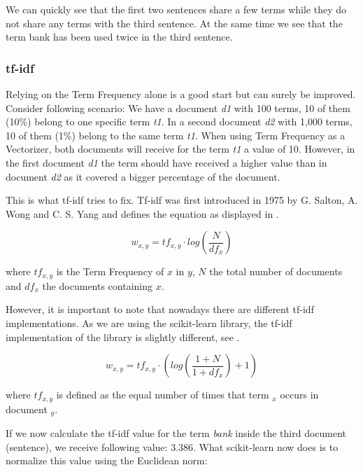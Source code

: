 We can quickly see that the first two sentences share a few terms
while they do not share any terms with the third sentence.
At the same time we see that the term bank has been used twice in the third sentence.

\subsubsection{tf-idf}
\label{subsubsec:3_tf_idf}

Relying on the Term Frequency alone is a good start but can surely be improved.
Consider following scenario:
We have a document \textit{d1} with 100 terms, 10 of them (10\%) belong to one specific term \textit{t1}.
In a second document \textit{d2} with 1,000 terms, 10 of them (1\%) belong to the same term \textit{t1}.
When using Term Frequency as a Vectorizer, both documents will receive for the term \textit{t1} a value of 10.
However, in the first document \textit{d1} the term should have received a higher value
than in document \textit{d2} as it covered a bigger percentage of the document.

This is what tf-idf tries to fix.
Tf-idf was first introduced in 1975 by G. Salton, A. Wong and C. S. Yang \cite{salton1975}
and defines the equation as displayed in .

\begin{equation}
    w_{x,y} = tf_{x,y} \cdot log(\frac{N}{df_x})
    \label{equ:tfidf}
\end{equation}

where $tf_{x,y}$ is the Term Frequency of $x$ in $y$, $N$ the total number of documents
and $df_x$ the documents containing $x$.

However, it is important to note that nowadays there are different tf-idf implementations.
As we are using the scikit-learn\cite{scikit-learn} library,
the tf-idf implementation\cite{scikit_tfidf} of the library is slightly different,
see .

\begin{equation}
    w_{x,y} = tf_{x,y} \cdot (log(\frac{1+N}{1+df_x}) + 1)
    \label{equ:scikit_tfidf}
\end{equation}

where $tf_{x,y}$ is defined as the equal number of times that term ${_x}$ occurs in document ${_y}$.

If we now calculate the tf-idf value for the term \textit{bank} inside the third document (sentence),
we receive following value: $3.386$.
What scikit-learn now does is to normalize this value using the Euclidean norm:

